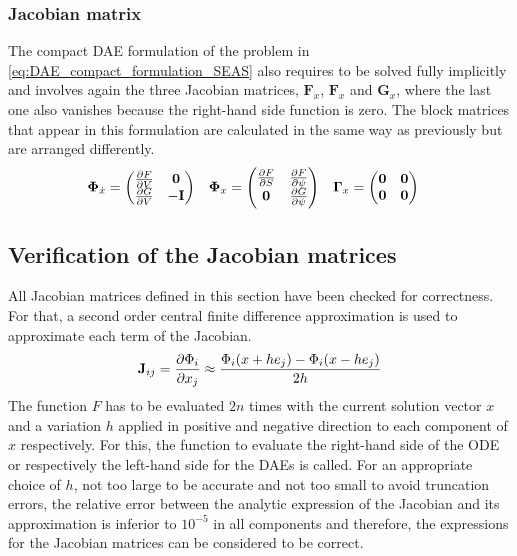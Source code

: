\subsubsection{Jacobian matrix}
The compact DAE formulation of the problem in \autoref{eq:DAE_compact_formulation_SEAS} also requires to be solved fully implicitly and involves again the three Jacobian matrices, $\mathbf{F}_{\dot{x}}$, $\mathbf{F}_x$ and $\mathbf{G}_x$, where the last one also vanishes because the right-hand side function is zero. The block matrices that appear in this formulation are calculated in the same way as previously but are arranged differently.
\begin{align}
	\label{eq:Jacobian_compact_DAE}
	\bm{\Phi}_{\dot{x}}&=  \begin{pmatrix}
								\pdv{F}{V} &  \mathbf{0} \\
							    \pdv{G}{V} & -\mathbf{I}
							\end{pmatrix} & 
	\bm{\Phi}_x        &=  \begin{pmatrix}
								\pdv{F}{S} & \pdv{F}{\psi} \\
								\mathbf{0} & \pdv{G}{\psi}
							\end{pmatrix} & 
	\bm{\Gamma}_x        &=  \begin{pmatrix}
								\mathbf{0} & \mathbf{0} \\
							    \mathbf{0} & \mathbf{0}
							\end{pmatrix}
\end{align}

\subsection{Verification of the Jacobian matrices}
All Jacobian matrices defined in this section have been checked for correctness. For that, a second order central finite difference approximation \cite[p. 184]{introductionPartialDiffEquations} is used to approximate each term of the Jacobian. 
\begin{equation}
	\mathbf{J}_{ij} = \pdv{\Phi_i}{x_j} \approx \frac{\Phi_i(x + he_j) - \Phi_i(x - he_j)}{2h}
\end{equation}
The function $F$ has to be evaluated $2n$ times with the current solution vector $x$ and a variation $h$ applied in positive and negative direction to each component of $x$ respectively. For this, the function to evaluate the right-hand side of the ODE or respectively the left-hand side for the DAEs is called. For an appropriate choice of $h$, not too large to be accurate and not too small to avoid truncation errors, the relative error between the analytic expression of the Jacobian and its approximation is inferior to $10^{-5}$ in all components and therefore, the expressions for the Jacobian matrices can be considered to be correct.

